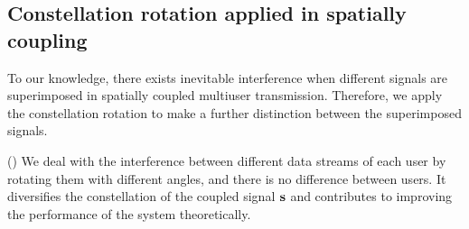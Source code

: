 \documentclass[conference]{IEEEtran}
\begin{document}
\subsection{Constellation rotation applied in spatially coupling}
To our knowledge, there exists inevitable interference when different signals are superimposed in spatially coupled multiuser transmission. Therefore, we apply the constellation rotation to make a further distinction between the superimposed signals.

(\uppercase\expandafter{}) We deal with the interference between different data streams of each user by rotating them with different angles, and there is no difference between users. It diversifies the constellation of the coupled signal ${\bf{s}}$ and contributes to improving the performance of the system theoretically.
\end{document}
